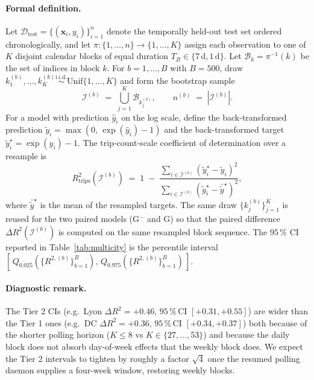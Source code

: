 \documentclass[11pt,a4paper]{article}
\begin{document}
\paragraph{Formal definition.}
Let $\mathcal{D}_{\mathrm{test}} = \{(\mathbf{x}_i, y_i)\}_{i=1}^{n}$
denote the temporally held-out test set ordered chronologically,
and let $\pi : \{1,\dots,n\} \to \{1,\dots,K\}$ assign each
observation to one of $K$ disjoint calendar blocks of equal
duration $T_B \in \{\mathrm{7\,d}, \mathrm{1\,d}\}$.  Let
$\mathcal{B}_k = \pi^{-1}(k)$ be the set of indices in block $k$.
For $b = 1, \dots, B$ with $B = 500$, draw
$k_1^{(b)}, \dots, k_K^{(b)} \overset{\text{i.i.d.}}{\sim}
\mathrm{Unif}\{1, \dots, K\}$ and form the bootstrap sample
\begin{equation}
    \mathcal{I}^{(b)} \;=\; \bigcup_{j=1}^{K} \mathcal{B}_{k_j^{(b)}}, \qquad
    n^{(b)} \;=\; |\mathcal{I}^{(b)}|.
    \label{eq:bootstrap-resample}
\end{equation}
For a model with prediction $\hat{y}_i$ on the log scale, define
the back-transformed prediction $\tilde{y}_i = \max(0,\,\exp(\hat{y}_i) - 1)$
and the back-transformed target $\tilde{y}^{\star}_i = \exp(y_i) - 1$.
The trip-count-scale coefficient of determination over a
resample is
\begin{equation}
    R^2_{\mathrm{trips}}(\mathcal{I}^{(b)}) \;=\;
    1 \;-\; \frac{\sum_{i \in \mathcal{I}^{(b)}} (\tilde{y}^{\star}_i - \tilde{y}_i)^2}
                  {\sum_{i \in \mathcal{I}^{(b)}} (\tilde{y}^{\star}_i - \bar{\tilde{y}}^{\star})^2},
    \label{eq:r2-trips}
\end{equation}
where $\bar{\tilde{y}}^{\star}$ is the mean of the resampled
targets.  The same draw $\{k_j^{(b)}\}_{j=1}^{K}$ is reused for
the two paired models (G$^-$ and G) so that the paired
difference $\Delta R^2(\mathcal{I}^{(b)})$ is computed on the
same resampled block sequence.  The $95\,\%$ CI reported in
Table~\ref{tab:multicity} is the percentile interval
$[\,Q_{0.025}(\{R^{2,(b)}\}_{b=1}^{B}),\,Q_{0.975}(\{R^{2,(b)}\}_{b=1}^{B})\,]$.

\paragraph{Diagnostic remark.}
The Tier 2 CIs (e.g.\ Lyon $\Delta R^2 = +0.46$,
$95\,\%$\,CI $[+0.31, +0.55]$) are wider than the Tier 1 ones
(e.g.\ DC $\Delta R^2 = +0.36$, $95\,\%$\,CI $[+0.34, +0.37]$)
both because of the shorter polling horizon ($K \leq 8$ vs
$K \in \{27, \dots, 53\}$) and because the daily block does not
absorb day-of-week effects that the weekly block does.  We
expect the Tier 2 intervals to tighten by roughly a factor
$\sqrt{4}$ once the resumed polling daemon supplies a four-week
window, restoring weekly blocks.
\end{document}
